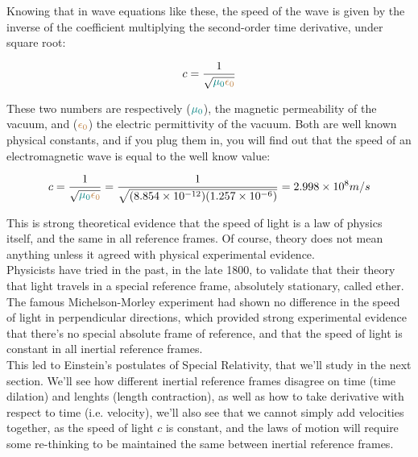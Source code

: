 Knowing that in wave equations like these, the speed of the wave is given by the inverse of the coefficient multiplying the second-order time derivative, under square root:

\begin{equation}
    c = \frac{1}{\sqrt{\begingroup\color{teal}\mu_0\endgroup \begingroup\color{brown}\epsilon_0\endgroup}}
\end{equation}

These two numbers are respectively ($\begingroup\color{teal}\mu_0\endgroup$), the magnetic permeability of the vacuum, and ($\begingroup\color{brown}\epsilon_0\endgroup$)
the electric permittivity of the vacuum. Both are well known physical constants, and if you plug them in, you will find out that the speed of an electromagnetic wave is equal 
to the well know value:

\begin{equation}
    c = \frac{1}{\sqrt{\begingroup\color{teal}\mu_0\endgroup \begingroup\color{brown}\epsilon_0\endgroup}} = 
    \frac{1}{\sqrt{(8.854 \times 10^{-12})(1.257 \times 10^{-6})}} = 2.998 \times 10^{8} m/s
\end{equation}

This is strong theoretical evidence that the speed of light is a law of physics itself, and the same in all reference frames. Of course, theory does not mean anything
unless it agreed with physical experimental evidence.\\

Physicists have tried in the past, in the late 1800, to validate that their theory that light travels in a special reference frame, absolutely stationary, called ether.\\
The famous Michelson-Morley experiment had shown no difference in the speed of light in perpendicular directions, which provided strong experimental evidence that there's no special absolute frame of reference, 
and that the speed of light is constant in all inertial reference frames.\\

This led to Einstein's postulates of Special Relativity, that we'll study in the next section.
We'll see how different inertial reference frames disagree on time (time dilation) and lenghts (length contraction), as well as 
how to take derivative with respect to time (i.e. velocity), we'll also see that we cannot simply add velocities together, as the speed of light $c$ is constant, 
and the laws of motion will require some re-thinking to be maintained the same between inertial reference frames.\\


